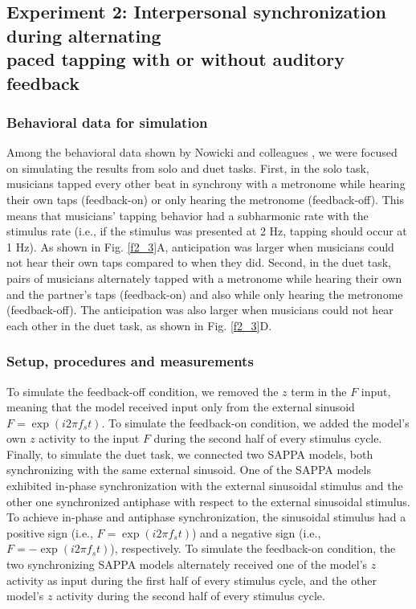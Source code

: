 \documentclass{report}
\begin{document}
\subsection{Experiment 2: Interpersonal synchronization during alternating \\ paced tapping with or without auditory feedback}

\subsubsection{Behavioral data for simulation}

Among the behavioral data shown by Nowicki and colleagues \cite{nowicki2013mutual}, we were focused on simulating the results from solo and duet tasks. First, in the solo task, musicians tapped every other beat in synchrony with a metronome while hearing their own taps (feedback-on) or only hearing the metronome (feedback-off). This means that musicians' tapping behavior had a subharmonic rate with the stimulus rate (i.e., if the stimulus was presented at 2 Hz, tapping should occur at 1 Hz). As shown in Fig.{} \ref{f2_3}A, anticipation was larger when musicians could not hear their own taps compared to when they did. Second, in the duet task, pairs of musicians alternately tapped with a metronome while hearing their own and the partner's taps (feedback-on) and also while only hearing the metronome (feedback-off). The anticipation was also larger when musicians could not hear each other in the duet task, as shown in Fig.{} \ref{f2_3}D.

\subsubsection{Setup, procedures and measurements}

To simulate the feedback-off condition, we removed the $z$ term in the $F$ input, meaning that the model received input only from the external sinusoid $F = \exp(i2\pi f_s t)$. To simulate the feedback-on condition, we added the model's own $z$ activity to the input $F$ during the second half of every stimulus cycle. Finally, to simulate the duet task, we connected two SAPPA models, both synchronizing with the same external sinusoid. One of the SAPPA models exhibited in-phase synchronization with the external sinusoidal stimulus and the other one synchronized antiphase with respect to the external sinusoidal stimulus. To achieve in-phase and antiphase synchronization, the sinusoidal stimulus had a positive sign (i.e., $F = \exp(i2\pi f_s t)$) and a negative sign (i.e., $F = -\exp(i2\pi f_s t)$), respectively. To simulate the feedback-on condition, the two synchronizing SAPPA models alternately received one of the model's $z$ activity as input during the first half of every stimulus cycle, and the other model's $z$ activity during the second half of every stimulus cycle.
\end{document}
